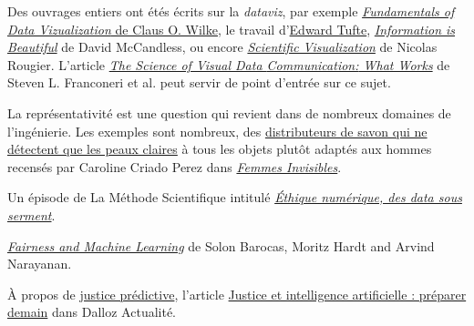 \begin{plusloin}
\item Des ouvrages entiers ont étés écrits sur la \textit{dataviz}, par exemple \href{https://clauswilke.com/dataviz/}{\textit{Fundamentals of Data Vizualization} de Claus O. Wilke}, le travail d'\href{https://www.edwardtufte.com/tufte/}{Edward Tufte}, \href{https://informationisbeautiful.net/}{\textit{Information is Beautiful}} de David McCandless, ou encore \href{https://github.com/rougier/scientific-visualization-book}{\textit{Scientific Visualization}} de Nicolas Rougier. L'article  \href{https://journals.sagepub.com/stoken/default+domain/10.1177\%2F15291006211051956-FREE/full}{\textit{The Science of Visual Data {\NoAutoSpaceBeforeFDP Communication:} What Works}} de Steven L. Franconeri et al. peut servir de point d'entrée sur ce sujet.
\item La représentativité est une question qui revient dans de nombreux
  domaines de l'ingénierie. Les exemples sont nombreux, des
  \href{https://www.rtl.be/art/info/monde/international/un-distributeur-de-savon-raciste-voici-l-explication-945832.aspx}{distributeurs
    de savon qui ne détectent que les peaux claires} à tous les
  objets plutôt adaptés aux hommes recensés par Caroline Criado
  Perez dans  \href{https://www.placedeslibraires.fr/livre/9782266338059-femmes-invisibles-comment-le-manque-de-donnees-sur-les-femmes-dessine-un-monde-fait-pour-les-hommes-caroline-criado-perez/}{\textit{Femmes Invisibles}}.  %
  \item Un épisode de La Méthode Scientifique  intitulé \href{https://april.org/ethique-numerique-des-datas-sous-serment-emission-la-methode-scientifique}{\textit{Éthique numérique, des data sous
    serment}}.
  \item \href{https://fairmlbook.org/}{\textit{Fairness and Machine Learning}} de Solon
    Barocas, Moritz Hardt and Arvind Narayanan.
  \item À propos de \href{https://www.latribune.fr/supplement/ceux-qui-transforment-la-france/la-justice-predictive-nouvel-outil-pour-les-professionnels-du-droit-837752.html}{justice prédictive}, l'article \href{https://www.dalloz-actualite.fr/flash/justice-et-intelligence-artificielle-preparer-demain-episode-i}{Justice
        et intelligence artificielle : préparer demain} dans Dalloz Actualité.

\end{plusloin}
